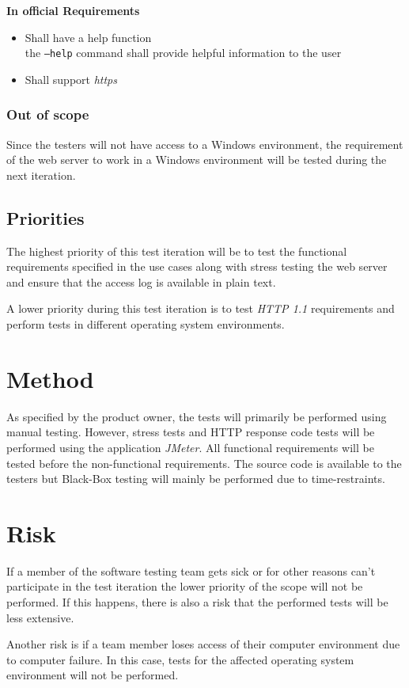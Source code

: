 \documentclass[a4paper, 12pt]{article}
\begin{document}
\textbf{In official Requirements}
\begin{itemize}
\item Shall have a help function \\the \texttt{--help} command shall provide helpful information to the user
\item Shall support \textit{https}
\end{itemize}

\subsubsection{Out of scope}
Since the testers will not have access to a Windows environment, the requirement of the web server to work in a Windows environment will be tested during the next iteration.

\subsection{Priorities}
The highest priority of this test iteration will be to test the functional requirements specified in the use cases along with stress testing the web server and ensure that the access log is available in plain text.

A lower priority during this test iteration is to test \textit{HTTP 1.1} requirements and perform tests in different operating system environments.

\section{Method}
As specified by the product owner, the tests will primarily be performed using manual testing. However, stress tests and HTTP response code tests will be performed using the application \textit{JMeter}. All functional requirements will be tested before the non-functional requirements. The source code is available to the testers but Black-Box testing will mainly be performed due to time-restraints.

\section{Risk}
If a member of the software testing team gets sick or for other reasons can't participate in the test iteration the lower priority of the scope will not be performed. If this happens, there is also a risk that the performed tests will be less extensive. 

Another risk is if a team member loses access of their computer environment due to computer failure. In this case, tests for the affected operating system environment will not be performed.
\end{document}
